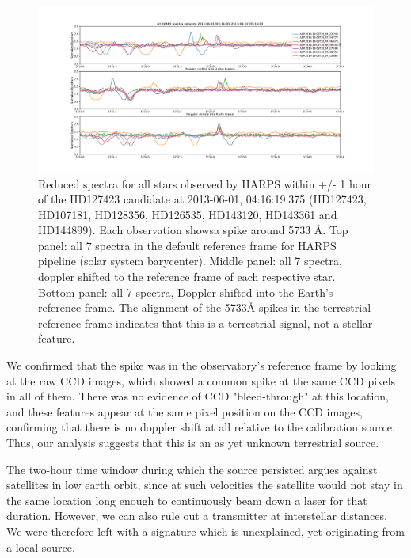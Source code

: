 \documentclass[twocolumn]{aastex701}
\begin{document}
\begin{figure}
    \centering
    \includegraphics[width=\textwidth]{HD127423Dopplershift.pdf}
    \caption{Reduced spectra for all stars observed by HARPS within +/- 1 hour of the HD127423 candidate at 2013-06-01, 04:16:19.375 (HD127423, HD107181, HD128356, HD126535, HD143120, HD143361 and HD144899).  Each observation showsa spike around 5733 \AA. Top panel: all 7 spectra in the default reference frame for HARPS pipeline (solar system barycenter). Middle panel: all 7 spectra, doppler shifted to the reference frame of each respective star. Bottom panel: all 7 spectra, Doppler shifted into the Earth's reference frame.  The alignment of the 5733{\AA} spikes in the terrestrial reference frame indicates that this is a terrestrial signal, not a stellar feature.}
    \label{fig:stellarframespectra}
\end{figure}

 We confirmed that the spike was in the observatory's reference frame by looking at the raw CCD images, which showed a common spike at the same CCD pixels in all of them.  There was no evidence of CCD "bleed-through" at this location, and these features appear at the same pixel position on the CCD images, confirming that there is no doppler shift at all relative to the calibration source. Thus, our analysis suggests that this is an as yet unknown terrestrial source.

The two-hour time window during which the source persisted argues against satellites in low earth orbit, since at such velocities the satellite would not stay in the same location long enough to continuously beam down a laser for that duration. However, we can also rule out a transmitter at interstellar distances. We were therefore left with a signature which is unexplained, yet originating from a local source. 
\end{document}
